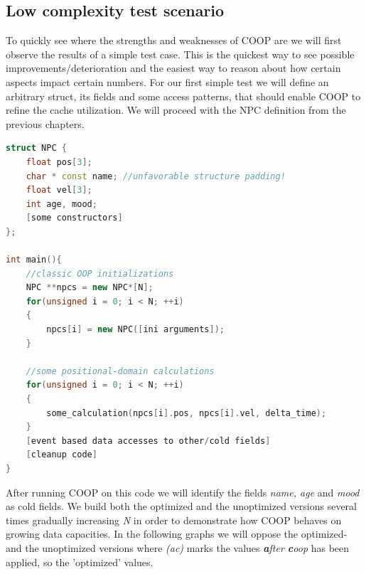 \subsection{Low complexity test scenario}
To quickly see where the strengths and weaknesses of COOP are we will first observe the results of a simple test case. This is the quickest way to see possible improvements/deterioration and the easiest way to reason about how certain aspects impact certain numbers. For our first simple test we will define an arbitrary struct, its fields and some access patterns, that should enable COOP to refine the cache utilization. We will proceed with the NPC definition from the previous chapters.
\begin{lstlisting}[language=C++, name={Simple test code in order to make first tests. It will heavily use an NPC's positional properties (pos, vel) and basically disregard the fields name, age and mood, as they would be accessed based on user generated events.}, label={simple_test}]
struct NPC {
	float pos[3];
	char * const name; //unfavorable structure padding!
	float vel[3];
	int age, mood;
	[some constructors]
};

int main(){
	//classic OOP initializations
	NPC **npcs = new NPC*[N];
	for(unsigned i = 0; i < N; ++i)
	{
		npcs[i] = new NPC([ini arguments]);
	}
	
	//some positional-domain calculations
	for(unsigned i = 0; i < N; ++i)
	{
		some_calculation(npcs[i].pos, npcs[i].vel, delta_time);
	}	
	[event based data accesses to other/cold fields]
	[cleanup code]
}
\end{lstlisting}
After running COOP on this code we will identify the fields \textit{name, age} and \textit{mood} as cold fields. We build both the optimized and the unoptimized versions several times gradually increasing \textit{N} in order to demonstrate how COOP behaves on growing data capacities. In the following graphs we will oppose the optimized- and the unoptimized versions where \textit{(ac)} marks the values \textit{\textbf{a}fter \textbf{c}oop} has been applied, so the 'optimized' values.
